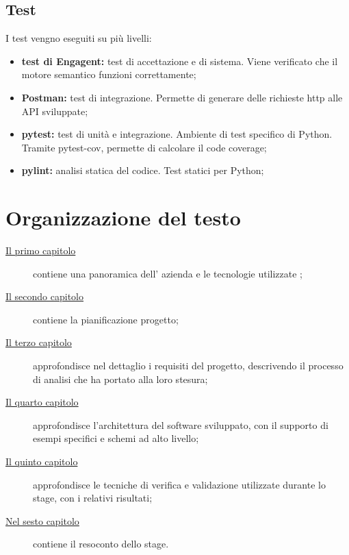 \subsection{Test}
I test vengno eseguiti su più livelli:
\begin{itemize}
    \item \textbf{test di Engagent:} test di accettazione e di sistema. Viene verificato che il motore semantico funzioni correttamente;
    \item \textbf{Postman:} test di integrazione. Permette di generare delle richieste http alle API sviluppate;
    \item \textbf{pytest:} test di unità e integrazione. Ambiente di test specifico di Python. Tramite pytest-cov, permette di calcolare il code coverage;
    \item \textbf{pylint:} analisi statica del codice. Test statici per Python;
\end{itemize}

\section{Organizzazione del testo}

\begin{description}
    \item[{\hyperref[cap:introduzione]{Il primo capitolo}}] contiene una panoramica dell' azienda e le tecnologie utilizzate \company;

    \item[{\hyperref[cap:descrizione-stage]{Il secondo capitolo}}] contiene la pianificazione progetto; 
    
    \item[{\hyperref[cap:analisi-requisiti]{Il terzo capitolo}}] approfondisce nel dettaglio i requisiti del progetto, descrivendo il processo di analisi che ha portato alla loro stesura;
    
    \item[{\hyperref[cap:progettazione-codifica]{Il quarto capitolo}}] approfondisce l'architettura del software sviluppato, con il supporto di esempi specifici e schemi ad alto livello;
    
    \item[{\hyperref[cap:verifica-validazione]{Il quinto capitolo}}] approfondisce le tecniche di verifica e validazione utilizzate durante lo stage, con i relativi risultati;
    
    \item[{\hyperref[cap:conclusioni]{Nel sesto capitolo}}] contiene il resoconto dello stage. 
\end{description}

